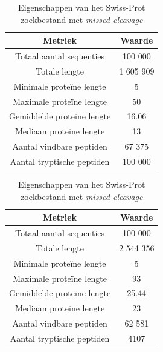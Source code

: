 \documentclass[11pt,dutch,faculty=we,layout=titlefont,underline=false,titleUppercase=true,titleUnderline=true]{ugent2016-report}
\begin{document}
    \begin{table}[!h]
        \begin{minipage}{.5\linewidth}
            \centering
            \begin{tabular}{c c}
                Metriek                    & Waarde    \\
                \hline\hline
                Totaal aantal sequenties   & 100 000   \\
                Totale lengte              & 1 605 909 \\
                Minimale proteïne lengte   & 5         \\
                Maximale proteïne lengte   & 50        \\
                Gemiddelde proteïne lengte & 16.06     \\
                Mediaan proteïne lengte    & 13        \\
                Aantal vindbare peptiden   & 67 375    \\
                Aantal tryptische peptiden & 100 000   \\
                \hline
            \end{tabular}
            \caption{Eigenschappen van \newline het Swiss-Prot zoekbestand \newline zonder \textit{missed cleavage}}
            \label{tab:swiss_geen_missed_cleavage}
        \end{minipage}
        \begin{minipage}{.5\linewidth}
            \centering
            \begin{tabular}{ c c }
                Metriek                    & Waarde    \\
                \hline\hline
                Totaal aantal sequenties   & 100 000   \\
                Totale lengte              & 2 544 356 \\
                Minimale proteïne lengte   & 5         \\
                Maximale proteïne lengte   & 93        \\
                Gemiddelde proteïne lengte & 25.44     \\
                Mediaan proteïne lengte    & 23        \\
                Aantal vindbare peptiden   & 62 581    \\
                Aantal tryptische peptiden & 4107      \\
                \hline
            \end{tabular}
            \caption{Eigenschappen van \newline het Swiss-Prot zoekbestand \newline met \textit{missed cleavage}}
            \label{tab:swiss_missed_cleavage}
        \end{minipage}
    \end{table}
\end{document}
